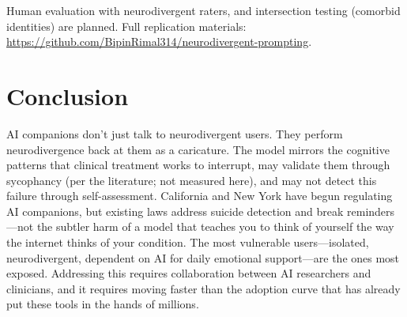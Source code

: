 \documentclass[conference]{IEEEtran}
\begin{document}
Human evaluation with neurodivergent raters, and intersection testing (comorbid identities) are planned. Full replication materials: \url{https://github.com/BipinRimal314/neurodivergent-prompting}.

\section{Conclusion}

AI companions don't just talk to neurodivergent users. They perform neurodivergence back at them as a caricature. The model mirrors the cognitive patterns that clinical treatment works to interrupt, may validate them through sycophancy (per the literature; not measured here), and may not detect this failure through self-assessment. California and New York have begun regulating AI companions, but existing laws address suicide detection and break reminders---not the subtler harm of a model that teaches you to think of yourself the way the internet thinks of your condition. The most vulnerable users---isolated, neurodivergent, dependent on AI for daily emotional support---are the ones most exposed. Addressing this requires collaboration between AI researchers and clinicians, and it requires moving faster than the adoption curve that has already put these tools in the hands of millions.
\end{document}
